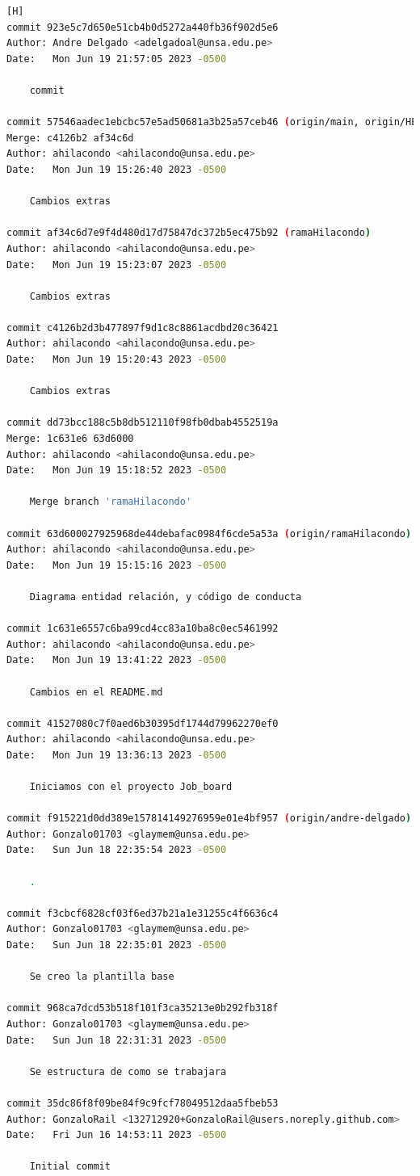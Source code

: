\documentclass{article}
\begin{document}
\begin{lstlisting}[language=bash,caption={Commits del laboratorio}][H]
commit 923e5c7d650e51cb4b0d5272a440fb36f902d5e6
Author: Andre Delgado <adelgadoal@unsa.edu.pe>
Date:   Mon Jun 19 21:57:05 2023 -0500

    commit

commit 57546aadec1ebcbc57e5ad50681a3b25a57ceb46 (origin/main, origin/HEAD, main)
Merge: c4126b2 af34c6d
Author: ahilacondo <ahilacondo@unsa.edu.pe>
Date:   Mon Jun 19 15:26:40 2023 -0500

    Cambios extras

commit af34c6d7e9f4d480d17d75847dc372b5ec475b92 (ramaHilacondo)
Author: ahilacondo <ahilacondo@unsa.edu.pe>
Date:   Mon Jun 19 15:23:07 2023 -0500

    Cambios extras

commit c4126b2d3b477897f9d1c8c8861acdbd20c36421
Author: ahilacondo <ahilacondo@unsa.edu.pe>
Date:   Mon Jun 19 15:20:43 2023 -0500

    Cambios extras

commit dd73bcc188c5b8db512110f98fb0dbab4552519a
Merge: 1c631e6 63d6000
Author: ahilacondo <ahilacondo@unsa.edu.pe>
Date:   Mon Jun 19 15:18:52 2023 -0500

    Merge branch 'ramaHilacondo'

commit 63d600027925968de44debafac0984f6cde5a53a (origin/ramaHilacondo)
Author: ahilacondo <ahilacondo@unsa.edu.pe>
Date:   Mon Jun 19 15:15:16 2023 -0500

    Diagrama entidad relación, y código de conducta

commit 1c631e6557c6ba99cd4cc83a10ba8c0ec5461992
Author: ahilacondo <ahilacondo@unsa.edu.pe>
Date:   Mon Jun 19 13:41:22 2023 -0500

    Cambios en el README.md

commit 41527080c7f0aed6b30395df1744d79962270ef0
Author: ahilacondo <ahilacondo@unsa.edu.pe>
Date:   Mon Jun 19 13:36:13 2023 -0500

    Iniciamos con el proyecto Job_board

commit f915221d0dd389e157814149276959e01e4bf957 (origin/andre-delgado)
Author: Gonzalo01703 <glaymem@unsa.edu.pe>
Date:   Sun Jun 18 22:35:54 2023 -0500

    .

commit f3cbcf6828cf03f6ed37b21a1e31255c4f6636c4
Author: Gonzalo01703 <glaymem@unsa.edu.pe>
Date:   Sun Jun 18 22:35:01 2023 -0500

    Se creo la plantilla base

commit 968ca7dcd53b518f101f3ca35213e0b292fb318f
Author: Gonzalo01703 <glaymem@unsa.edu.pe>
Date:   Sun Jun 18 22:31:31 2023 -0500

    Se estructura de como se trabajara

commit 35dc86f8f09be84f9c9fcf78049512daa5fbeb53
Author: GonzaloRail <132712920+GonzaloRail@users.noreply.github.com>
Date:   Fri Jun 16 14:53:11 2023 -0500

    Initial commit
    
	\end{lstlisting}
	
\end{document}
